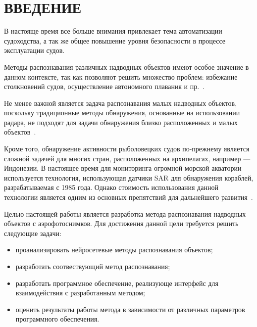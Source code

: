 \chapter*{ВВЕДЕНИЕ}

В настояще время все больше внимания привлекает тема автоматизации судоходства, а так же общее повышение уровня безопасности в процессе эксплуатации судов.

Методы распознавания различных надводных объектов имеют особое значение в данном контексте, так как позволяют решить множество проблем: избежание столкновений судов, осуществление автономного плавания и пр.~\cite{ship-detection}.

Не менее важной является задача распознавания малых надводных объектов, поскольку традиционные методы обнаружения, основанные на использовании радара, не подходят для задачи обнаружения близко расположенных и малых объектов~\cite{small-ship-detection}.

Кроме того, обнаружение активности рыболовецких судов по-прежнему является сложной задачей для многих стран, расположенных на архипелагах, например --- Индонезии. В настоящее время для мониторинга огромной морской акватории используется технология, использующая датчики SAR для обнаружения кораблей, разрабатываемая с 1985 года. Однако стоимость использования данной технологии является одним из основных препятствий для дальнейшего развития~\cite{fishing-boat-detection-using-sentinel-1}.

Целью настоящей работы является разработка метода распознавания надводных объектов с аэрофотоснимков. Для достижения данной цели требуется решить следующие задачи:
\begin{itemize}[label=---]
    \item проанализировать нейросетевые методы распознавания объектов;
    \item разработать соотвествующий метод распознавания;
    \item разработать программное обеспечение, реализующе интерфейс для взаимодействия с разработанным методом;
    \item оценить результаты работы метода в зависимости от различных параметров программного обеспечения.
\end{itemize}